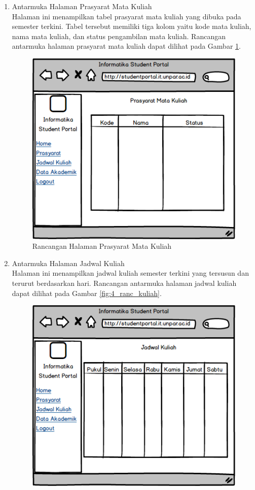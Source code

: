 \begin{enumerate}
	\item {Antarmuka Halaman Prasyarat Mata Kuliah}\\
	Halaman ini menampilkan tabel prasyarat mata kuliah yang dibuka pada semester terkini. Tabel tersebut memiliki tiga kolom yaitu kode mata kuliah, nama mata kuliah, dan status pengambilan mata kuliah. Rancangan antarmuka halaman prasyarat mata kuliah dapat dilihat pada Gambar \ref{fig:4_ranc_prasyarat}.
	\begin{figure}[H]
			\centering
			\includegraphics[scale=0.5]{Gambar/Prasyarat_Page}
			\caption{Rancangan Halaman Prasyarat Mata Kuliah} 
			\label{fig:4_ranc_prasyarat}
		\end{figure}
	\item {Antarmuka Halaman Jadwal Kuliah}\\
	Halaman ini menampilkan jadwal kuliah semester terkini yang tersusun dan terurut berdasarkan hari. Rancangan antarmuka halaman jadwal kuliah dapat dilihat pada Gambar \ref{fig:4_ranc_kuliah}.
	\begin{figure}[H]
			\centering
			\includegraphics[scale=0.5]{Gambar/Jadwal_Page}

\end{figure}
\end{enumerate}
